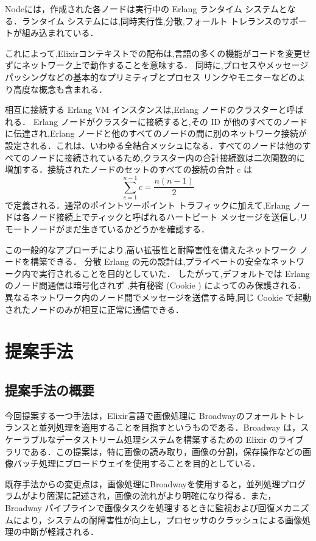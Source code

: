 \documentclass[a4paper]{jreport}	%
\begin{document}
Nodeには，作成された各ノードは実行中の Erlang ランタイム システムとなる．ランタイム システムには,同時実行性,分散,フォールト トレランスのサポートが組み込まれている．

これによって,Elixirコンテキストでの配布は,言語の多くの機能がコードを変更せずにネットワーク上で動作することを意味する． 同時に,プロセスやメッセージ パッシングなどの基本的なプリミティブとプロセス リンクやモニターなどのより高度な概念も含まれる．

相互に接続する Erlang VM インスタンスは,Erlang ノードのクラスターと呼ばれる． Erlang ノードがクラスターに接続すると,その ID が他のすべてのノードに伝達され,Erlang ノードと他のすべてのノードの間に別のネットワーク接続が設定される．これは、いわゆる全結合メッシュになる．すべてのノードは他のすべてのノードに接続されているため,クラスター内の合計接続数は二次関数的に増加する．接続されたノードのセットのすべての接続の合計 c は \[ \sum_{c=1}^{n-1}c = \frac{n(n-1)}2\]で定義される．通常のポイントツーポイント トラフィックに加えて,Erlang ノードは各ノード接続上でティックと呼ばれるハートビート メッセージを送信し,リモートノードがまだ生きているかどうかを確認する．


この一般的なアプローチにより,高い拡張性と耐障害性を備えたネットワーク ノードを構築できる． 分散 Erlang の元の設計は,プライベートの安全なネットワーク内で実行されることを目的としていた． したがって,デフォルトでは Erlang のノード間通信は暗号化されず \cite{I},共有秘密 (Cookie ) によってのみ保護される．異なるネットワーク内のノード間でメッセージを送信する時,同じ Cookie で起動されたノードのみが相互に正常に通信できる．




\chapter{提案手法}
\section{提案手法の概要}
今回提案する一つ手法は，Elixir言語で画像処理に Broadwayのフォールトトレランスと並列処理を適用することを目指すというものである．Broadway は，スケーラブルなデータストリーム処理システムを構築するための Elixir のライブラリである．この提案は，特に画像の読み取り，画像の分割，保存操作などの画像バッチ処理にブロードウェイを使用することを目的としている． 

既存手法からの変更点は，画像処理にBroadwayを使用すると，並列処理プログラムがより簡潔に記述され，画像の流れがより明確になり得る．また，Broadway パイプラインで画像タスクを処理するときに監視および回復メカニズムにより，システムの耐障害性が向上し，プロセッサのクラッシュによる画像処理の中断が軽減される．
\end{document}
